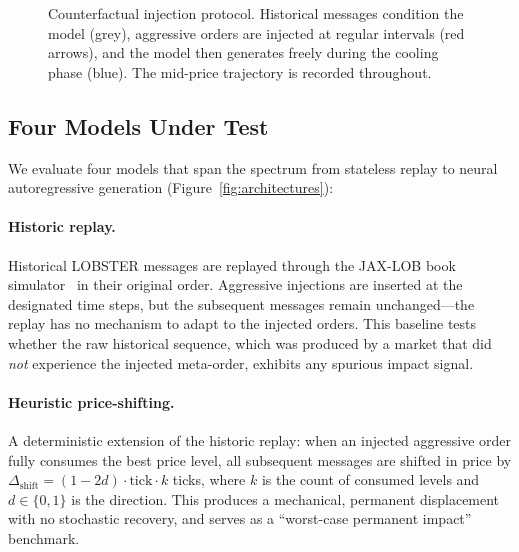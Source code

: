 \documentclass[sigplan,screen,anonymous]{acmart}
\begin{document}
\begin{figure}[t]
  \centering
  \caption{Counterfactual injection protocol. Historical messages condition the model (grey), aggressive orders are injected at regular intervals (red arrows), and the model then generates freely during the cooling phase (blue). The mid-price trajectory is recorded throughout.}
  \label{fig:protocol}
\end{figure}

\subsection{Four Models Under Test}
\label{sec:models}

We evaluate four models that span the spectrum from stateless replay to neural autoregressive generation (Figure~\ref{fig:architectures}):

\paragraph{Historic replay.} Historical LOBSTER messages are replayed through the JAX-LOB book simulator~\cite{lobster2023} in their original order. Aggressive injections are inserted at the designated time steps, but the subsequent messages remain unchanged---the replay has no mechanism to adapt to the injected orders. This baseline tests whether the raw historical sequence, which was produced by a market that did \emph{not} experience the injected meta-order, exhibits any spurious impact signal.

\paragraph{Heuristic price-shifting.} A deterministic extension of the historic replay: when an injected aggressive order fully consumes the best price level, all subsequent messages are shifted in price by $\Delta_{\text{shift}} = (1 - 2d) \cdot \text{tick} \cdot k$ ticks, where $k$ is the count of consumed levels and $d \in \{0,1\}$ is the direction. This produces a mechanical, permanent displacement with no stochastic recovery, and serves as a ``worst-case permanent impact'' benchmark.
\end{document}
